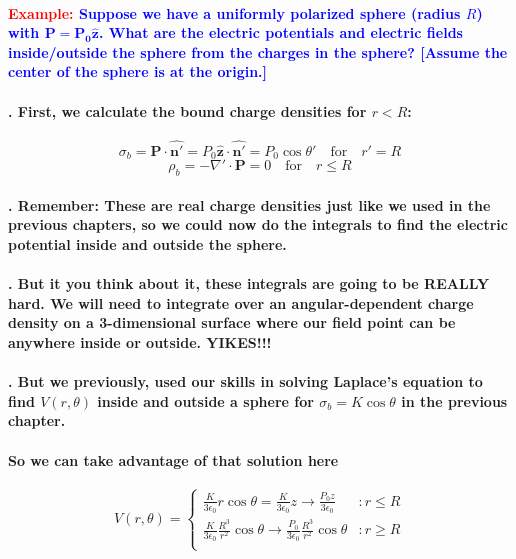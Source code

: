 \documentclass{article}
\begin{document}
\paragraph{\textcolor{red}{Example:} \textcolor{blue}{Suppose we have a uniformly polarized sphere (radius $R$) with $\boldsymbol{P=P_0\hat{z}}$. What are the electric potentials and electric fields inside/outside the sphere from the charges in the sphere? [Assume the center of the sphere is at the origin.]}}
\paragraph{. First, we calculate the bound charge densities for $r<R$:}
\begin{equation*}
    \sigma_b=\boldsymbol{P}\cdot\hat{\boldsymbol{n'}}=P_0\hat{\boldsymbol{z}}\cdot \hat{\boldsymbol{n'}}=P_0\cos\theta' \quad\text{for}\quad r'=R
\end{equation*}
\begin{equation*}
    \rho_b=-\nabla'\cdot \boldsymbol{P}=0 \quad\text{for} \quad r\leq R
\end{equation*}
\paragraph{. Remember: These are real charge densities just like we used in the previous chapters, so we could now do the integrals to find the electric potential inside and outside the sphere.}
\paragraph{. But it you think about it, these integrals are going to be REALLY hard. We will need to integrate over an angular-dependent charge density on a 3-dimensional surface where our field point can be anywhere inside or outside. YIKES!!!}
\paragraph{. But we previously, used our skills in solving Laplace's equation to find $V(r,\theta)$ inside and outside a sphere for $\sigma_b=K\cos\theta$ in the previous chapter.}
\paragraph{\indent So we can take advantage of that solution here}
\begin{equation*}
    V(r,\theta)= \begin{cases}
        \frac{K}{3\epsilon_0}r\cos\theta=\frac{K}{3\epsilon_0}z\rightarrow\frac{P_0z}{3\epsilon_0} & :r\leq R\\
        \frac{K}{3\epsilon_0}\frac{R^3}{r^2}\cos\theta\rightarrow\frac{P_0}{3\epsilon_0}\frac{R^3}{r^2}\cos\theta & :r\geq R\\
    \end{cases}
\end{equation*}
\end{document}
